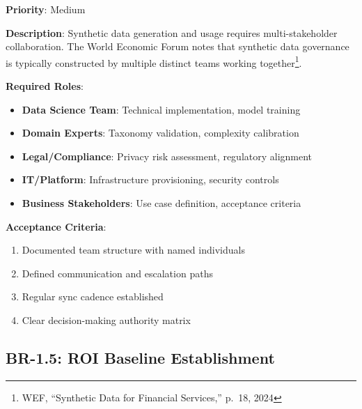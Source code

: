 \begin{tcolorbox}[colback=blue!5,colframe=blue!70,title=BR-1.4: Cross-Functional Team Organization]
\textbf{Priority}: Medium

\textbf{Description}: Synthetic data generation and usage requires multi-stakeholder
collaboration. The World Economic Forum notes that synthetic data governance is
typically constructed by multiple distinct teams working together\footnote{WEF,
``Synthetic Data for Financial Services,'' p.~18, 2024}.

\textbf{Required Roles}:
\begin{itemize}
  \item \textbf{Data Science Team}: Technical implementation, model training
  \item \textbf{Domain Experts}: Taxonomy validation, complexity calibration
  \item \textbf{Legal/Compliance}: Privacy risk assessment, regulatory alignment
  \item \textbf{IT/Platform}: Infrastructure provisioning, security controls
  \item \textbf{Business Stakeholders}: Use case definition, acceptance criteria
\end{itemize}

\textbf{Acceptance Criteria}:
\begin{enumerate}
  \item Documented team structure with named individuals
  \item Defined communication and escalation paths
  \item Regular sync cadence established
  \item Clear decision-making authority matrix
\end{enumerate}
\end{tcolorbox}

\subsection{BR-1.5: ROI Baseline Establishment}

